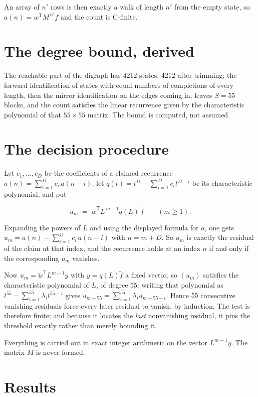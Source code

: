 \documentclass[11pt]{article}
\theoremstyle{definition}
\begin{document}
An array of $n'$ rows is then exactly a walk of length $n'$ from the empty state, so $a(n) = w^{\mathsf T}M^{\,n'}f$ and the count is C-finite.

\section{The degree bound, derived}

The reachable part of the digraph has $4212$ states, $4212$ after trimming; the forward identification of states with equal numbers of completions of every length, then the mirror identification on the edges coming in, leaves $S = 55$ blocks, and the count satisfies the linear recurrence given by the characteristic polynomial of that $55\times55$ matrix. The bound is computed, not assumed.

\section{The decision procedure}

Let $c_1,\dots,c_D$ be the coefficients of a claimed recurrence $a(n) = \sum_{i=1}^{D} c_i\,a(n-i)$, let $q(t) = t^{D} - \sum_{i=1}^{D} c_i t^{D-i}$ be its characteristic polynomial, and put

\[u_m \;=\; \tilde w^{\mathsf T} L^{\,m-1} q(L)\,\tilde f \qquad (m \ge 1).\]

Expanding the powers of $L$ and using the displayed formula for $a$, one gets $u_m = a(n) - \sum_{i=1}^{D} c_i\,a(n-i)$ with $n = m + D$. So $u_m$ is exactly the residual of the claim at that index, and the recurrence holds at an index $n$ if and only if the corresponding $u_m$ vanishes.

Now $u_m = \tilde w^{\mathsf T} L^{m-1} y$ with $y = q(L)\tilde f$ a fixed vector, so $(u_m)$ satisfies the characteristic polynomial of $L$, of degree $55$: writing that polynomial as $t^{55} - \sum_{i=1}^{55} \lambda_i t^{55-i}$ gives $u_{m+55} = \sum_{i=1}^{55} \lambda_i u_{m+55-i}$. Hence $55$ consecutive vanishing residuals force every later residual to vanish, by induction. The test is therefore finite; and because it locates the {\itshape last} nonvanishing residual, it pins the threshold exactly rather than merely bounding it.

Everything is carried out in exact integer arithmetic on the vector $L^{m-1}y$. The matrix $M$ is never formed.

\section{Results}
\end{document}
